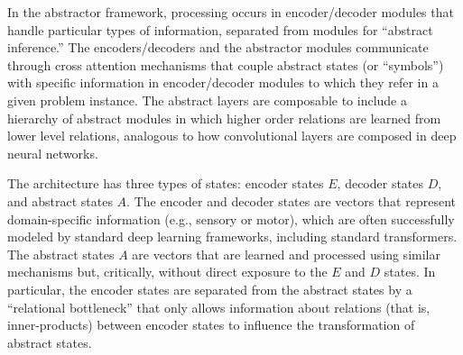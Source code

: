 In the abstractor framework, processing occurs in encoder/decoder modules that handle particular types of information, separated from modules for ``abstract inference.'' The encoders/decoders and the abstractor modules communicate through cross attention mechanisms that couple abstract states (or ``symbols'') with specific information in encoder/decoder modules to which they refer in a given problem instance.  The abstract layers are composable to include a hierarchy of abstract modules in which higher order relations are learned from lower level relations, analogous to how convolutional layers are composed in deep neural networks.

The architecture has three types of states: encoder states $E$, decoder states $D$, and abstract states $A$. The encoder and decoder states are vectors
that represent domain-specific information (e.g., sensory or motor), which are often successfully modeled  
by standard deep learning frameworks, including standard transformers. The abstract states $A$ are vectors 
that are learned and processed using similar mechanisms but, critically, without direct exposure to the $E$ and $D$ states.  In particular, the encoder states are separated from the abstract states by a ``relational bottleneck'' 
that only allows information about relations (that is, inner-products) between encoder 
states to influence the transformation of abstract states.

